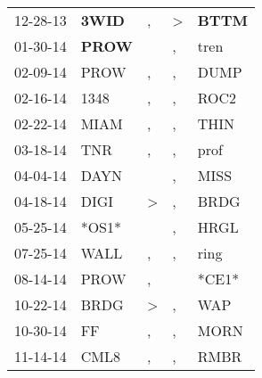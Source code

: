 \begin{supertabular}{p{0.07\textwidth}p{0.06\textwidth}p{0.02\textwidth}p{0.02\textwidth}p{0.06\textwidth}}
          12-28-13\textsuperscript{} &  \textbf{3WID\textsuperscript{}} &                , &     \textgreater &  \textbf{BTTM\textsuperscript{}} \\
          01-30-14\textsuperscript{} &  \textbf{PROW\textsuperscript{}} &                  &                , &           tren\textsuperscript{} \\
          02-09-14\textsuperscript{} &           PROW\textsuperscript{} &                , &                , &           DUMP\textsuperscript{} \\
          02-16-14\textsuperscript{} &           1348\textsuperscript{} &                , &                , &           ROC2\textsuperscript{} \\
          02-22-14\textsuperscript{} &           MIAM\textsuperscript{} &                , &                , &           THIN\textsuperscript{} \\
          03-18-14\textsuperscript{} &            TNR\textsuperscript{} &                , &                , &           prof\textsuperscript{} \\
          04-04-14\textsuperscript{} &           DAYN\textsuperscript{} &                  &                , &           MISS\textsuperscript{} \\
          04-18-14\textsuperscript{} &           DIGI\textsuperscript{} &     \textgreater &                , &           BRDG\textsuperscript{} \\
          05-25-14\textsuperscript{} &                            *OS1* &                  &                , &           HRGL\textsuperscript{} \\
          07-25-14\textsuperscript{} &           WALL\textsuperscript{} &                , &                , &           ring\textsuperscript{} \\
          08-14-14\textsuperscript{} &           PROW\textsuperscript{} &                , &                  &                            *CE1* \\
          10-22-14\textsuperscript{} &           BRDG\textsuperscript{} &     \textgreater &                , &            WAP\textsuperscript{} \\
          10-30-14\textsuperscript{} &             FF\textsuperscript{} &                , &                , &           MORN\textsuperscript{} \\
          11-14-14\textsuperscript{} &           CML8\textsuperscript{} &                , &                , &           RMBR\textsuperscript{} \\

\end{supertabular}
